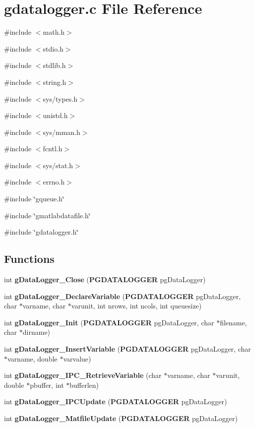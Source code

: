 \section{gdatalogger.c File Reference}
\label{gdatalogger_8c}
{\ttfamily \#include $<$math.h$>$}\par
{\ttfamily \#include $<$stdio.h$>$}\par
{\ttfamily \#include $<$stdlib.h$>$}\par
{\ttfamily \#include $<$string.h$>$}\par
{\ttfamily \#include $<$sys/types.h$>$}\par
{\ttfamily \#include $<$unistd.h$>$}\par
{\ttfamily \#include $<$sys/mman.h$>$}\par
{\ttfamily \#include $<$fcntl.h$>$}\par
{\ttfamily \#include $<$sys/stat.h$>$}\par
{\ttfamily \#include $<$errno.h$>$}\par
{\ttfamily \#include \char`\"{}gqueue.h\char`\"{}}\par
{\ttfamily \#include \char`\"{}gmatlabdatafile.h\char`\"{}}\par
{\ttfamily \#include \char`\"{}gdatalogger.h\char`\"{}}\par
\subsection*{Functions}
\begin{DoxyCompactItemize}
\item 
int {\bf gDataLogger\_\-Close} ({\bf PGDATALOGGER} pgDataLogger)
\item 
int {\bf gDataLogger\_\-DeclareVariable} ({\bf PGDATALOGGER} pgDataLogger, char $\ast$varname, char $\ast$varunit, int nrows, int ncols, int queuesize)
\item 
int {\bf gDataLogger\_\-Init} ({\bf PGDATALOGGER} pgDataLogger, char $\ast$filename, char $\ast$dirname)
\item 
int {\bf gDataLogger\_\-InsertVariable} ({\bf PGDATALOGGER} pgDataLogger, char $\ast$varname, double $\ast$varvalue)
\item 
int {\bf gDataLogger\_\-IPC\_\-RetrieveVariable} (char $\ast$varname, char $\ast$varunit, double $\ast$pbuffer, int $\ast$bufferlen)
\item 
int {\bf gDataLogger\_\-IPCUpdate} ({\bf PGDATALOGGER} pgDataLogger)
\item 
int {\bf gDataLogger\_\-MatfileUpdate} ({\bf PGDATALOGGER} pgDataLogger)
\end{DoxyCompactItemize}


